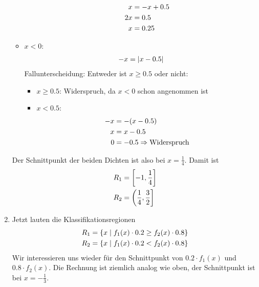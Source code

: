 \documentclass{article}
\begin{document}
\begin{enumerate}[label=(\alph*)]
\begin{itemize}
\begin{itemize}
\begin{align}
					x &= -x + 0.5 \notag \\
					2x &= 0.5 \notag \\
					x &= 0.25 \notag
				\end{align}
			\end{itemize}
			\item $x < 0$:
			\begin{align}
				-x = \vert x-0.5\vert \notag
			\end{align}
			Fallunterscheidung: Entweder ist $x\ge 0.5$ oder nicht:
			\begin{itemize}
				\item $x\ge 0.5$: Widerspruch, da $x<0$ schon angenommen ist
				\item $x<0.5$:
				\begin{align}
					-x &= -(x-0.5) \notag \\
					x &= x-0.5 \notag \\
					0 &= -0.5 \Rightarrow\text{Widerspruch} \notag
				\end{align}
			\end{itemize}
		\end{itemize}
		Der Schnittpunkt der beiden Dichten ist also bei $x=\frac{1}{4}$. Damit ist
		\begin{align}
			R_1 &= \left[-1,\frac{1}{4}\right] \notag \\
			R_2 &= \left(\frac{1}{4},\frac{3}{2}\right] \notag
		\end{align}
		\item Jetzt lauten die Klassifikationsregionen
		\begin{align}
			R_1 &= \left\lbrace x\mid f_1(x)\cdot 0.2 \ge f_2(x)\cdot 0.8\right\rbrace \notag \\
			R_2 &= \left\lbrace x\mid f_1(x)\cdot 0.2 < f_2(x)\cdot 0.8\right\rbrace \notag
		\end{align}
		Wir interessieren uns wieder für den Schnittpunkt von $0.2\cdot f_1(x)$ und $0.8\cdot f_2(x)$. Die Rechnung ist ziemlich analog wie oben, der Schnittpunkt ist bei $x=-\frac{1}{3}$.
		\begin{center}
\end{center}
\end{enumerate}
\end{document}
